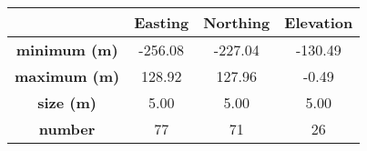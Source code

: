 \begin{tabular}{cccc}
\toprule
{} & Easting & Northing & Elevation \\
\midrule
\textbf{minimum (m)} & -256.08 &  -227.04 &   -130.49 \\
\textbf{maximum (m)} &  128.92 &   127.96 &     -0.49 \\
\textbf{size (m)   } &    5.00 &     5.00 &      5.00 \\
\textbf{number     } &      77 &       71 &        26 \\
\bottomrule
\end{tabular}
